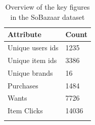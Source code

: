     \begin{table}[H]
        \centering
        \begin{tabular}{l l}
            \toprule
            Attribute       & Count   \\ \midrule
            Unique users ids   & 1235           \\
            Unique item ids    & 3386           \\
            Unique brands      & 16             \\
            Purchases          & 1484           \\
            Wants              & 7726           \\
            Item Clicks        & 14036          \\
            \bottomrule
        \caption[Dataset summary]{Overview of the key figures in the SoBazaar dataset}
        \label{table:datasetSummary}
        \end{tabular}
    \end{table}



